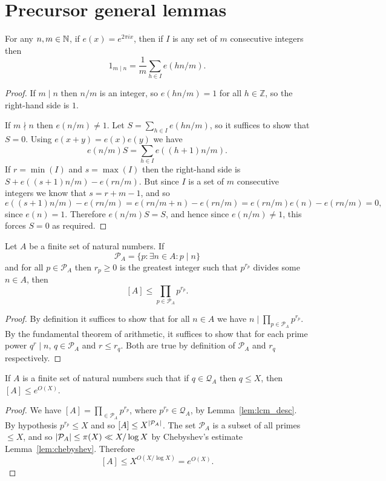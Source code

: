 \section{Precursor general lemmas}

\begin{lemma}\label{lem:orthogonality}
  \leanok
For any $n,m\in\mathbb{N}$, if $e(x) = e^{2\pi ix}$, then if $I$ is any set of $m$ consecutive integers then
\[1_{m\mid n}=\frac{1}{m}\sum_{h\in I}e(h n/m).\]
\end{lemma}
\begin{proof}
  \leanok
If $m\mid n$ then $n/m$ is an integer, so $e(hn/m)=1$ for all $h\in \mathbb{Z}$, so the right-hand side is $1$.

If $m\nmid n$ then $e(n/m)\neq 1$. Let $S=\sum_{h\in I}e(hn/m)$, so it suffices to show that $S=0$. Using $e(x+y)=e(x)e(y)$ we have
\[e(n/m)S = \sum_{h\in I}e((h+1)n/m).\]
If $r=\min(I)$ and $s=\max(I)$ then the right-hand side is $S + e((s+1)n/m)-e(rn/m)$. But since $I$ is a set of $m$ consecutive integers we know that $s=r+m-1$, and so
\[e((s+1)n/m)-e(rn/m) = e(rn/m+n)-e(rn/m)=e(rn/m)e(n)-e(rn/m)=0,\]
since $e(n)=1$. Therefore $e(n/m)S=S$, and hence since $e(n/m)\neq 1$, this forces $S=0$ as required.
\end{proof}

\begin{lemma}\label{lem:lcm_desc}
Let $A$ be a finite set of natural numbers. If
\[\mathcal{P}_A = \{ p : \exists n\in A : p \mid n\}\]
and for all $p\in \mathcal{P}_A$ then $r_p\geq 0$ is the greatest integer such that $p^{r_p}$ divides some $n\in A$, then
\[[A]\leq \prod_{p\in\mathcal{P}_A}p^{r_p}.\]
\end{lemma}
\begin{proof}
By definition it suffices to show that for all $n\in A$ we have $n\mid \prod_{p\in\mathcal{P}_A}p^{r_p}$. By the fundamental theorem of arithmetic, it suffices to show that for each prime power $q^r\mid n$, $q\in \mathcal{P}_A$ and $r\leq r_q$. Both are true by definition of $\mathcal{P}_A$ and $r_q$ respectively.
\end{proof}

\begin{lemma}\label{lem:smooth_lcm}
If $A$ is a finite set of natural numbers such that if $q\in\mathcal{Q}_A$ then $q\leq X$, then $[A]\leq e^{O(X)}$.
\end{lemma}
\begin{proof}
  We have $[A]=\prod_{\in\mathcal{P}_A}p^{r_p}$, where $p^{r_p}\in \mathcal{Q}_A$, by Lemma~\ref{lem:lcm_desc}. By hypothesis $p^{r_p}\leq X$ and so $[A]\leq X^{\left\lvert \mathcal{P}_A\right\rvert}$. The set $\mathcal{P}_A$ is a subset of all primes $\leq X$, and so $\left\lvert \mathcal{P}_A\right\rvert\leq \pi(X)\ll X/\log X$ by Chebyshev's estimate Lemma~\ref{lem:chebyshev}. Therefore
  \[[A]\leq X^{O(X/\log X)}=e^{O(X)}.\]
\end{proof}

